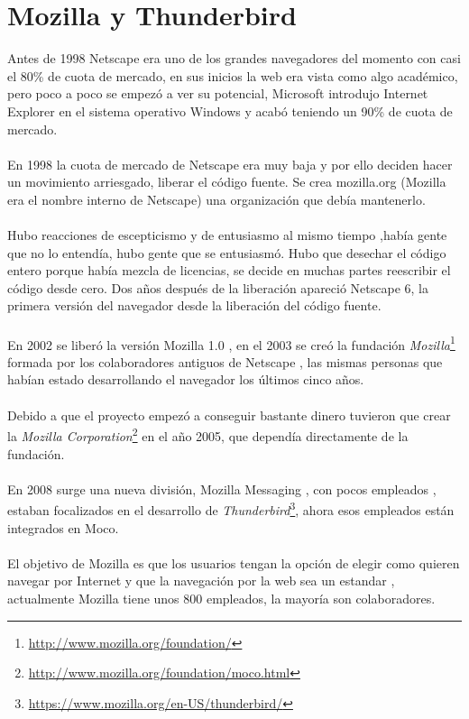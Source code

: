 \documentclass[a4paper,oneside,11pt]{article}
\begin{document}
\section{Mozilla y Thunderbird}

Antes de 1998 Netscape era uno de los grandes navegadores del momento con casi el 80\% de cuota de mercado, en sus inicios la web
era vista como algo acad\'emico, pero poco a poco se empez\'o a ver su potencial, Microsoft introdujo Internet Explorer en el 
sistema operativo Windows y acab\'o teniendo un 90\% de cuota de mercado.
\\\\
En 1998 la cuota de mercado de Netscape era muy baja y por ello deciden hacer un movimiento arriesgado, liberar el
c\'odigo fuente. Se crea mozilla.org (Mozilla era el nombre interno de Netscape) una organizaci\'on que deb\'ia mantenerlo.
 \\\\
Hubo reacciones de escepticismo y de entusiasmo al mismo tiempo ,hab\'ia gente que no lo entend\'ia, hubo gente que se entusiasm\'o. 
Hubo que desechar el c\'odigo entero porque hab\'ia mezcla de licencias, se decide en muchas partes reescribir el c\'odigo desde cero.
Dos años despu\'es de la liberaci\'on apareci\'o Netscape 6, la primera versi\'on del navegador desde la liberaci\'on del c\'odigo fuente.
\\\\
En 2002 se liber\'o la versi\'on Mozilla 1.0 , en el 2003 se cre\'o la fundaci\'on \emph{Mozilla}\footnote{\url{http://www.mozilla.org/foundation/}} formada por los colaboradores
antiguos de Netscape , las mismas personas que hab\'ian estado desarrollando el navegador los \'ultimos cinco años.
\\\\
Debido a que el proyecto empez\'o a conseguir bastante dinero tuvieron que crear la \emph{Mozilla Corporation}\footnote{\url{http://www.mozilla.org/foundation/moco.html}} en el año 2005, que 
depend\'ia directamente de la fundaci\'on.
\\\\
En 2008 surge una nueva divisi\'on, Mozilla Messaging , con pocos empleados , estaban focalizados en el desarrollo de \emph{Thunderbird}\footnote{\url{https://www.mozilla.org/en-US/thunderbird/}}, 
ahora esos empleados est\'an integrados en Moco.
\\\\
El objetivo de Mozilla es que los usuarios tengan la opci\'on de elegir como quieren navegar por Internet y que la 
navegaci\'on por la web sea un estandar , actualmente Mozilla tiene unos 800 empleados, la mayor\'ia 
son colaboradores. 
\end{document}
